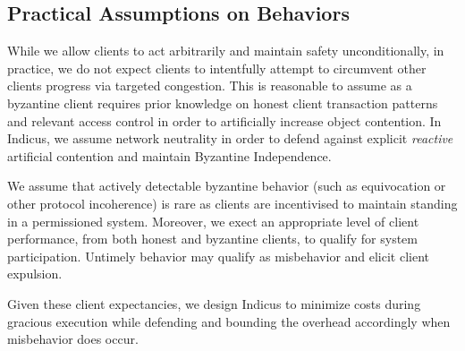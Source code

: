 \subsection{Practical Assumptions on Behaviors}
While we allow clients to act arbitrarily and maintain safety unconditionally, in practice, we do not expect clients to intentfully attempt to circumvent other clients progress via targeted congestion. This is reasonable to assume as a byzantine client requires prior knowledge on honest client transaction patterns and relevant access control  in order to artificially increase object contention. 
In Indicus, we assume network neutrality in order to defend against explicit \textit{reactive} artificial contention and maintain Byzantine Independence.

We assume that actively detectable byzantine behavior (such as equivocation or other protocol incoherence) is rare as clients are incentivised to maintain standing in a permissioned system.
Moreover, we exect an appropriate level of client performance, from both honest and byzantine clients, to qualify for system participation. Untimely behavior may qualify as misbehavior and elicit client expulsion. 

Given these client expectancies, we design Indicus to minimize costs during gracious execution while defending and bounding the overhead accordingly when misbehavior does occur.
